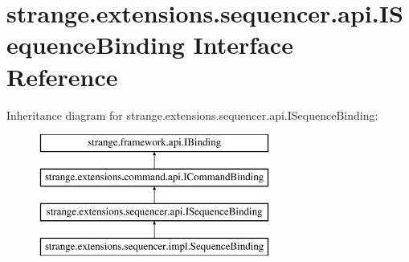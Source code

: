 \hypertarget{interfacestrange_1_1extensions_1_1sequencer_1_1api_1_1_i_sequence_binding}{\section{strange.\-extensions.\-sequencer.\-api.\-I\-Sequence\-Binding Interface Reference}
\label{interfacestrange_1_1extensions_1_1sequencer_1_1api_1_1_i_sequence_binding}
}
Inheritance diagram for strange.\-extensions.\-sequencer.\-api.\-I\-Sequence\-Binding\-:\begin{figure}[H]
\begin{center}
\leavevmode
\includegraphics[height=4.000000cm]{interfacestrange_1_1extensions_1_1sequencer_1_1api_1_1_i_sequence_binding}
\end{center}
\end{figure}
